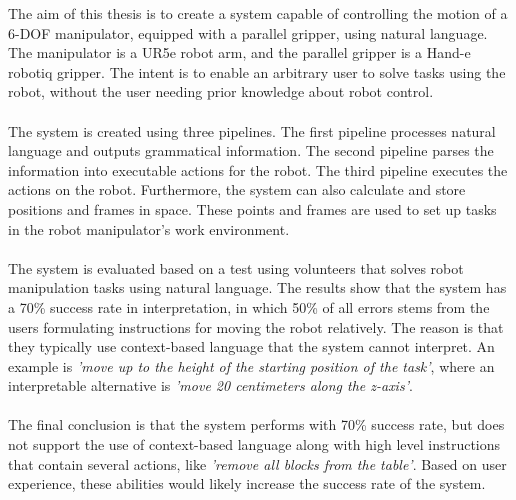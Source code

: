 \setlength{\parindent}{0pt}
\normalsize
The aim of this thesis is to create a system capable of controlling the motion of a 6-DOF manipulator, equipped with a parallel gripper, using natural language. The manipulator is a UR5e robot arm, and the parallel gripper is a Hand-e robotiq gripper. The intent is to enable an arbitrary user to solve tasks using the robot, without the user needing prior knowledge about robot control.
\\\\
The system is created using three pipelines. The first pipeline processes natural language and outputs grammatical information. The second pipeline parses the information into executable actions for the robot. The third pipeline executes the actions on the robot. Furthermore, the system can also calculate and store positions and frames in space. These points and frames are used to set up tasks in the robot manipulator's work environment.
\\\\
The system is evaluated based on a test using volunteers that solves robot manipulation tasks using natural language. The results show that the system has a 70\% success rate in interpretation, in which 50\% of all errors stems from the users formulating instructions for moving the robot relatively. The reason is that they typically use context-based language that the system cannot interpret. An example is \textit{'move up to the height of the starting position of the task'}, where an interpretable alternative is \textit{'move 20 centimeters along the z-axis'}.
\\\\
The final conclusion is that the system performs with 70\% success rate, but does not support the use of context-based language along with high level instructions that contain several actions, like \textit{'remove all blocks from the table'}. Based on user experience, these abilities would likely increase the success rate of the system.